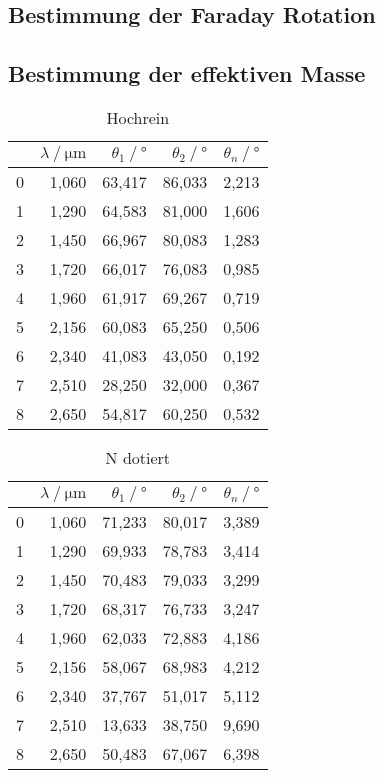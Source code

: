 \subsection{Bestimmung der Faraday Rotation}

\subsection{Bestimmung der effektiven Masse}
\begin{table}
    \centering
    \begin{tabular}{lrrrr}
        \toprule
        {} &  $\lambda \:/\: \si{\micro\metre}$ &  $\theta_1 \:/\: °$ &  $\theta_2 \:/\: °$ &  $\theta_n  \:/\: °$ \\
        \midrule
        0 &   1,060 &   63,417 &   86,033 &    2,213 \\
        1 &   1,290 &   64,583 &   81,000 &    1,606 \\
        2 &   1,450 &   66,967 &   80,083 &    1,283 \\
        3 &   1,720 &   66,017 &   76,083 &    0,985 \\
        4 &   1,960 &   61,917 &   69,267 &    0,719 \\
        5 &   2,156 &   60,083 &   65,250 &    0,506 \\
        6 &   2,340 &   41,083 &   43,050 &    0,192 \\
        7 &   2,510 &   28,250 &   32,000 &    0,367 \\
        8 &   2,650 &   54,817 &   60,250 &    0,532 \\
        \bottomrule
    \end{tabular}
    \caption{Hochrein}
    \label{tab:hochrein}
\end{table}

\begin{table}
    \centering
    \begin{tabular}{lrrrr}
        \toprule
        {} &  $\lambda \:/\: \si{\micro\metre}$ &  $\theta_1 \:/\: °$ &  $\theta_2 \:/\: °$ &  $\theta_n  \:/\: °$ \\
        \midrule
        0 &   1,060 &   71,233 &   80,017 &    3,389 \\
        1 &   1,290 &   69,933 &   78,783 &    3,414 \\
        2 &   1,450 &   70,483 &   79,033 &    3,299 \\
        3 &   1,720 &   68,317 &   76,733 &    3,247 \\
        4 &   1,960 &   62,033 &   72,883 &    4,186 \\
        5 &   2,156 &   58,067 &   68,983 &    4,212 \\
        6 &   2,340 &   37,767 &   51,017 &    5,112 \\
        7 &   2,510 &   13,633 &   38,750 &    9,690 \\
        8 &   2,650 &   50,483 &   67,067 &    6,398 \\
        \bottomrule
    \end{tabular}
    \caption{N dotiert}
    \label{tab:ndotiert}
\end{table}


